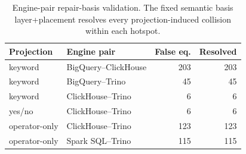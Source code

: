 \begin{table}[H]
\centering
\caption{Engine-pair repair-basis validation. The fixed semantic basis layer+placement resolves every projection-induced collision within each hotspot.}
\label{tab:repair-basis-enginepair}
\begin{tabular}{llrr}
\toprule
Projection & Engine pair & False eq. & Resolved \\
\midrule
keyword & BigQuery--ClickHouse & 203 & 203 \\
keyword & BigQuery--Trino & 45 & 45 \\
keyword & ClickHouse--Trino & 6 & 6 \\
yes/no & ClickHouse--Trino & 6 & 6 \\
operator-only & ClickHouse--Trino & 123 & 123 \\
operator-only & Spark SQL--Trino & 115 & 115 \\
\bottomrule
\end{tabular}
\end{table}
